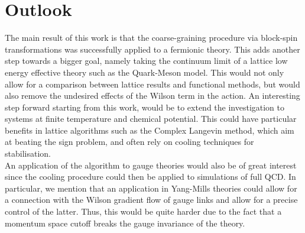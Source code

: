 \section*{Outlook}
The main result of this work is that the coarse-graining procedure via block-spin transformations was successfully applied to a fermionic theory. This adds another step towards a bigger goal, namely taking the continuum limit of a lattice low energy effective theory such as the Quark-Meson model. 
This would not only allow for a comparison between lattice results and functional methods, but would also remove the undesired effects of the Wilson term in the action. An interesting step forward starting from this work, would be to extend the investigation to systems at finite temperature and chemical potential. 
This could have particular benefits in lattice algorithms such as the Complex Langevin method, which aim at beating the sign problem, and often rely on cooling techniques for stabilisation. \\
An application of the algorithm to gauge theories would also be of great interest since the cooling procedure could then be applied to simulations of full QCD.  
In particular, we mention that an application in Yang-Mills theories could allow for a connection with the Wilson gradient flow of gauge links and allow for a precise control of the latter. Thus, this would be quite harder due to the fact that a momentum space cutoff breaks the gauge invariance of the theory.